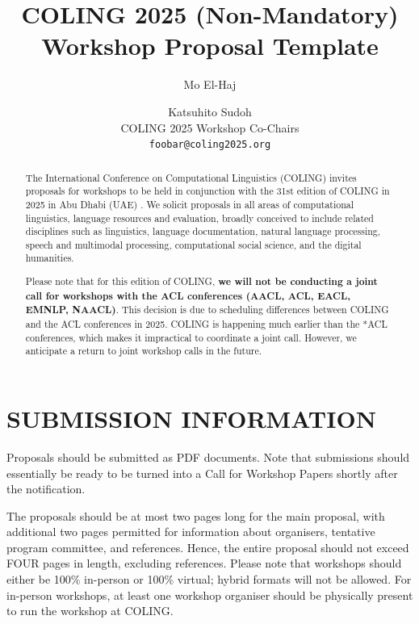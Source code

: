 \documentclass[11pt]{article}
\title{COLING 2025 (Non-Mandatory) Workshop Proposal Template}
\author{ Mo El-Haj \and Katsuhito Sudoh \\
COLING 2025 Workshop Co-Chairs \\
\texttt{foobar@coling2025.org}
}
\begin{document}
\maketitle
\begin{abstract}
The International Conference on Computational Linguistics (COLING) invites proposals for workshops to be held in conjunction with the 31st edition of COLING in 2025  in Abu Dhabi (UAE) \cite{coling2025}.
We solicit proposals in all areas of computational linguistics, language resources and evaluation, broadly conceived to include related disciplines such as linguistics, language documentation, natural language processing, speech and multimodal processing, computational social science, and the digital humanities.

Please note that for this edition of COLING, \textbf{we will not be conducting a joint call for workshops with the ACL conferences (AACL, ACL, EACL, EMNLP, NAACL)}. This decision is due to scheduling differences between COLING and the ACL conferences in 2025. COLING is happening much earlier than the *ACL conferences, which makes it impractical to coordinate a joint call. However, we anticipate  a return to joint workshop calls in the future.
\end{abstract}

\section{SUBMISSION INFORMATION}
Proposals should be submitted as PDF documents. Note that submissions should essentially be ready to be turned into a Call for Workshop Papers shortly after the  notification.

The proposals should be at most two pages long for the main proposal, with additional two pages permitted for information about organisers, tentative program committee, and references. Hence, the entire proposal should not exceed FOUR pages in length, excluding references. Please note that workshops should either be 100\% in-person or 100\% virtual; hybrid formats will not be allowed. For in-person workshops, at least one workshop organiser should be physically present to run the workshop at COLING.
\end{document}

